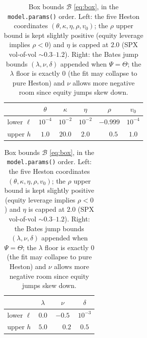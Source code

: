 \documentclass[a4paper, 11pt, reqno]{amsart}
\begin{document}
		\vspace{-0.8em}
		\begin{table}[H]
		\centering
		\small
		\begin{tabular}{lccccc}
			\toprule
			& $\theta$ & $\kappa$ & $\eta$ & $\rho$ & $v_0$ \\
			\midrule
			lower $\ell$ & $10^{-4}$ & $10^{-2}$ & $10^{-2}$ & $-0.999$ & $10^{-4}$ \\
			upper $h$    & $1.0$     & $20.0$    & $2.0$     & $\phantom{-}0.5$ & $1.0$ \\
			\bottomrule
		\end{tabular}
		\qquad
		\begin{tabular}{lccc}
			\toprule
			& $\lambda$ & $\nu$ & $\delta$ \\
			\midrule
			lower $\ell$ & $0.0$ & $-0.5$ & $10^{-3}$ \\
			upper $h$    & $5.0$ & $\phantom{-}0.2$ & $0.5$ \\
			\bottomrule
		\end{tabular}
		\vspace*{-0.75em}
		\caption{Box bounds $\mathcal{B}$ \eqref{eq:box}, in the \texttt{model.params()} order. Left: the
		five Heston coordinates $(\theta,\kappa,\eta,\rho,v_0)$; the $\rho$ upper bound is kept slightly
		positive (equity leverage implies $\rho<0$) and $\eta$ is capped at $2.0$ (SPX vol-of-vol
		$\sim 0.3$--$1.2$). Right: the Bates jump bounds $(\lambda,\nu,\delta)$ appended when $\Psi=\Theta$;
		the $\lambda$ floor is exactly $0$ (the fit may collapse to pure Heston) and $\nu$ allows more
		negative room since equity jumps skew down.}
		\label{tab:bounds}\label{tab:bates-bounds}
		\end{table}
	
\end{document}
